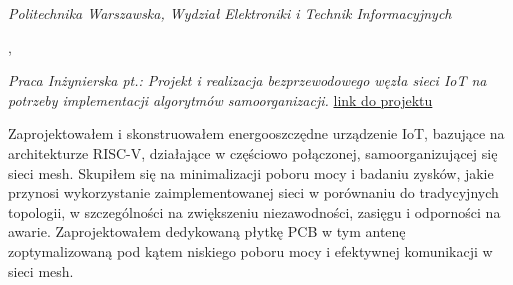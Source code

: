 
\textit{Politechnika Warszawska, Wydział Elektroniki i Technik
    Informacyjnych}

,

\textit{Praca Inżynierska pt.: Projekt i realizacja bezprzewodowego
    węzła sieci IoT na potrzeby implementacji algorytmów samoorganizacji.}
\href{https://github.com/lyraei/ion_board}{link do projektu}

\vspace{2pt}
Zaprojektowałem i skonstruowałem energooszczędne urządzenie IoT, bazujące na architekturze RISC-V, działające w częściowo połączonej, samoorganizującej się sieci mesh. Skupiłem się na minimalizacji poboru mocy i badaniu zysków, jakie przynosi wykorzystanie zaimplementowanej sieci w porównaniu do tradycyjnych topologii, w szczególności na zwiększeniu niezawodności, zasięgu i odporności na awarie. Zaprojektowałem dedykowaną płytkę PCB w tym antenę zoptymalizowaną pod kątem niskiego poboru mocy i efektywnej komunikacji w sieci mesh.

